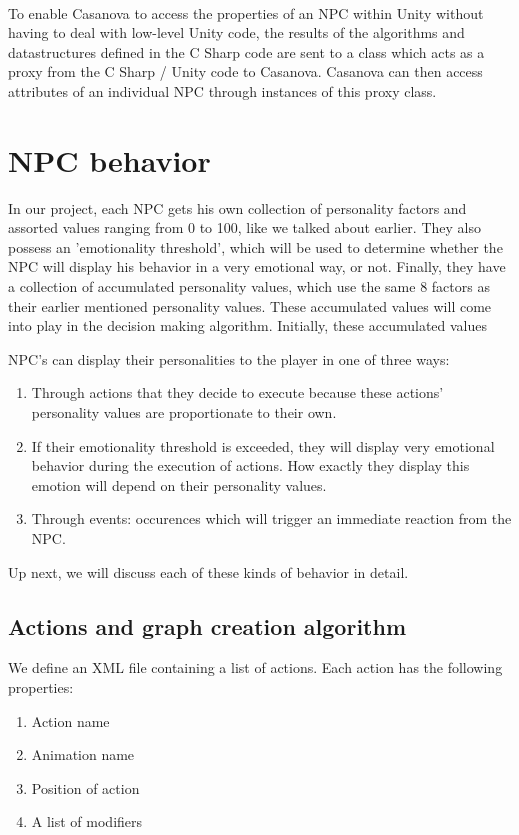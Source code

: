 \documentclass[11pt]{article} %
\begin{document}
~\\
To enable Casanova to access the properties of an NPC within Unity without having to deal with low-level Unity code, the results of the  algorithms and datastructures defined in the C Sharp code are sent to a class which acts as a proxy from the C Sharp / Unity code to Casanova. Casanova can then access attributes of an individual NPC through instances of this proxy class.

\newpage
\section{NPC behavior}
In our project, each NPC gets his own collection of personality factors and assorted values ranging from 0 to 100, like we talked about earlier. They also possess an 'emotionality threshold', which will be used to determine whether the NPC will display his behavior in a very emotional way, or not. Finally, they have a collection of accumulated personality values, which use the same 8 factors as their earlier mentioned personality values. These accumulated values will come into play in the decision making algorithm. Initially, these accumulated values 

NPC's can display their personalities to the player in one of three ways:
\begin{enumerate}
\item Through actions that they decide to execute because these actions' personality values are proportionate to their own.
\item If their emotionality threshold is exceeded, they will display very emotional behavior during the execution of actions. How exactly they display this emotion will depend on their personality values.
\item Through events: occurences which will trigger an immediate reaction from the NPC.
\end{enumerate}

Up next, we will discuss each of these kinds of behavior in detail.

\subsection{Actions and graph creation algorithm}
We define an XML file containing a list of actions. Each action has the following properties:

\begin{enumerate}
\item Action name
\item Animation name
\item Position of action
\item A list of modifiers
\end{enumerate}
\end{document}
